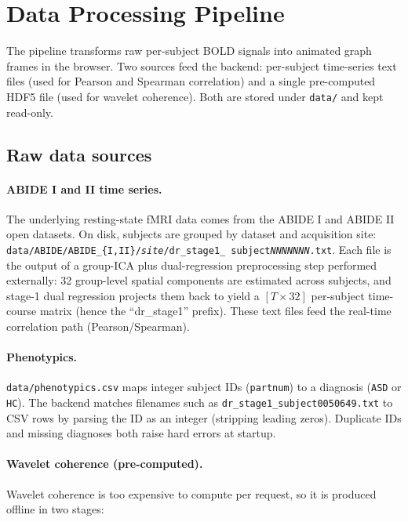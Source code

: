 \documentclass[11pt,a4paper]{article}
\begin{document}
\section{Data Processing Pipeline}

The pipeline transforms raw per-subject BOLD signals into animated
graph frames in the browser. Two sources feed the backend: per-subject
time-series text files (used for Pearson and Spearman correlation) and
a single pre-computed HDF5 file (used for wavelet coherence). Both are
stored under \texttt{data/} and kept read-only.

\subsection{Raw data sources}

\paragraph{ABIDE I and II time series.} The underlying resting-state
fMRI data comes from the ABIDE I and ABIDE II open datasets. On disk,
subjects are grouped by dataset and acquisition site:
\texttt{data/ABIDE/ABIDE\_\{I,II\}/\textit{site}/dr\_stage1\_\allowbreak
subject\textit{NNNNNNN}.txt}. Each file is the output of a group-ICA
plus dual-regression preprocessing step performed externally: 32
group-level spatial components are estimated across subjects, and
stage-1 dual regression projects them back to yield a
$[T \times 32]$ per-subject time-course matrix (hence the
``dr\_stage1'' prefix). These text files feed the real-time
correlation path (Pearson/Spearman).

\paragraph{Phenotypics.} \texttt{data/phenotypics.csv} maps integer
subject IDs (\texttt{partnum}) to a diagnosis (\texttt{ASD} or
\texttt{HC}). The backend matches filenames such as
\texttt{dr\_stage1\_subject0050649.txt} to CSV rows by parsing the ID
as an integer (stripping leading zeros). Duplicate IDs and missing
diagnoses both raise hard errors at startup.

\paragraph{Wavelet coherence (pre-computed).} Wavelet coherence is too
expensive to compute per request, so it is produced offline in two
stages:
\end{document}
